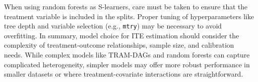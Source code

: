 When using random forests as S-learners, care must be taken to ensure that the treatment variable is included in the splits. Proper tuning of hyperparameters like tree depth and variable selection (e.g., \texttt{mtry}) may be necessary to avoid overfitting.
In summary, model choice for ITE estimation should consider the complexity of treatment-outcome relationships, sample size, and calibration needs. While complex models like TRAM-DAGs and random forests can capture complicated heterogeneity, simpler models may offer more robust performance in smaller datasets or where treatment-covariate interactions are straightforward.



% 
% 
% 
% 
% 

